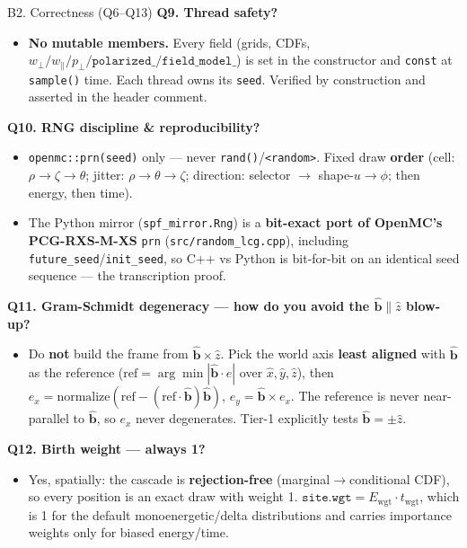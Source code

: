 \documentclass[11pt,aspectratio=169]{beamer}
\newcommand{\bhat}{\hat{\mathbf{b}}}
\newcommand{\qitem}[1]{\medskip\textbf{#1}\par}
\begin{document}
\begin{frame}[allowframebreaks]{B2. Correctness (Q6--Q13)}
\qitem{Q9. Thread safety?}
\begin{itemize}
\item \textbf{No mutable members.} Every field (grids, CDFs,
      $w_\perp/w_\parallel/p_\perp/\texttt{polarized\_}/\texttt{field\_model\_}$) is set in the
      constructor and \texttt{const} at \texttt{sample()} time. Each thread owns its
      \texttt{seed}. Verified by construction and asserted in the header comment.
\end{itemize}

\qitem{Q10. RNG discipline \& reproducibility?}
\begin{itemize}
\item \texttt{openmc::prn(seed)} only --- never \texttt{rand()}/\texttt{<random>}. Fixed draw
      \textbf{order} (cell: $\rho \to \zeta \to \theta$; jitter: $\rho \to \theta \to \zeta$;
      direction: selector $\to$ shape-$u \to \phi$; then energy, then time).
\item The Python mirror (\texttt{spf\_mirror.Rng}) is a \textbf{bit-exact port of OpenMC's
      PCG-RXS-M-XS} \texttt{prn} (\texttt{src/random\_lcg.cpp}), including
      \texttt{future\_seed}/\texttt{init\_seed}, so C++ vs Python is bit-for-bit on an
      identical seed sequence --- the transcription proof.
\end{itemize}

\framebreak
\qitem{Q11. Gram-Schmidt degeneracy --- how do you avoid the $\bhat \parallel \hat z$ blow-up?}
\begin{itemize}
\item Do \textbf{not} build the frame from $\bhat \times \hat z$. Pick the world axis
      \textbf{least aligned} with $\bhat$ as the reference
      ($\text{ref} = \arg\min|\bhat \cdot \hat e|$ over $\hat x, \hat y, \hat z$), then
      $e_x = \text{normalize}(\text{ref} - (\text{ref} \cdot \bhat)\bhat)$,
      $e_y = \bhat \times e_x$. The reference is never near-parallel to $\bhat$, so $e_x$ never
      degenerates. Tier-1 explicitly tests $\bhat = \pm\hat z$.
\end{itemize}

\qitem{Q12. Birth weight --- always 1?}
\begin{itemize}
\item Yes, spatially: the cascade is \textbf{rejection-free} (marginal$\to$conditional CDF),
      so every position is an exact draw with weight 1.
      $\texttt{site.wgt} = E_{\text{wgt}} \cdot t_{\text{wgt}}$, which is 1 for the default
      monoenergetic/delta distributions and carries importance weights only for biased
      energy/time.
\end{itemize}


\end{frame}
\end{document}
